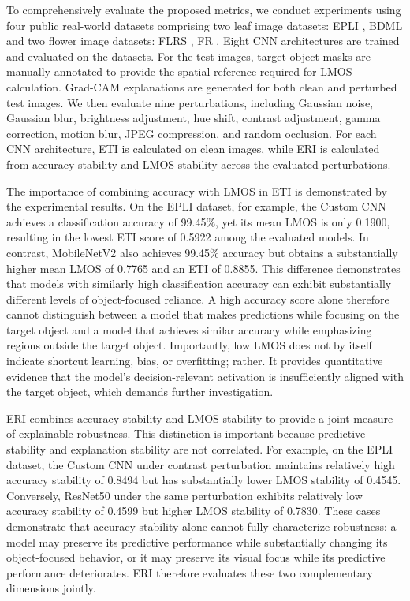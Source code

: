 \documentclass[a4paper,fleqn]{cas-dc}
\begin{document}
To comprehensively evaluate the proposed metrics, we conduct experiments using four public real-world datasets comprising two leaf image datasets:  EPLI \cite{r10}, BDML\cite{r11} and two flower image datasets: FLRS \cite{r12}, FR \cite{r13}. Eight CNN architectures are trained and evaluated on the datasets. For the test images, target-object masks are manually annotated to provide the spatial reference required for LMOS calculation. Grad-CAM explanations are generated for both clean and perturbed test images. We then evaluate nine perturbations, including Gaussian noise, Gaussian blur, brightness adjustment, hue shift, contrast adjustment, gamma correction, motion blur, JPEG compression, and random occlusion. For each CNN architecture, ETI is calculated on clean images, while ERI is calculated from accuracy stability and LMOS stability across the evaluated perturbations.

The importance of combining accuracy with LMOS in ETI is demonstrated by the experimental results. On the EPLI dataset, for example, the Custom CNN achieves a classification accuracy of 99.45\%, yet its mean LMOS is only 0.1900, resulting in the lowest ETI score of 0.5922 among the evaluated models. In contrast, MobileNetV2 also achieves 99.45\% accuracy but obtains a substantially higher mean LMOS of 0.7765 and an ETI of 0.8855. This difference demonstrates that models with similarly high classification accuracy can exhibit substantially different levels of object-focused reliance. A high accuracy score alone therefore cannot distinguish between a model that makes predictions while focusing on the target object and a model that achieves similar accuracy while emphasizing regions outside the target object. Importantly, low LMOS does not by itself indicate shortcut learning, bias, or overfitting; rather. It provides quantitative evidence that the model's decision-relevant activation is insufficiently aligned with the target object, which demands further investigation.


ERI combines accuracy stability and LMOS stability to provide a joint measure of explainable robustness. This distinction is important because predictive stability and explanation stability are not correlated. For example, on the EPLI dataset, the Custom CNN under contrast perturbation maintains relatively high accuracy stability of 0.8494 but has substantially lower LMOS stability of 0.4545. Conversely, ResNet50 under the same perturbation exhibits relatively low accuracy stability of 0.4599 but higher LMOS stability of 0.7830. These cases demonstrate that accuracy stability alone cannot fully characterize robustness: a model may preserve its predictive performance while substantially changing its object-focused behavior, or it may preserve its visual focus while its predictive performance deteriorates. ERI therefore evaluates these two complementary dimensions jointly.
\end{document}
